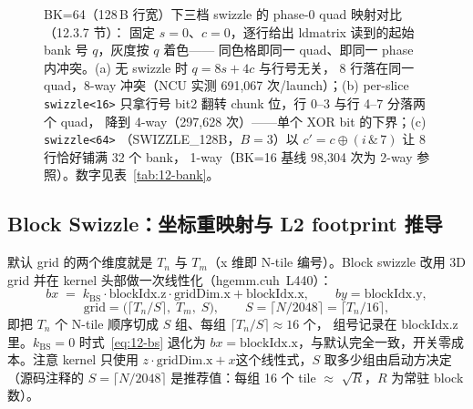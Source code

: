 \begin{figure}[H]
\caption{BK=64（128\,B 行宽）下三档 swizzle 的 phase-0 quad 映射对比（12.3.7 节）：
固定 $s{=}0$、$c{=}0$，逐行给出 ldmatrix 读到的起始 bank 号 $q$，灰度按 $q$ 着色——
同色格即同一 quad、即同一 phase 内冲突。(a) 无 swizzle 时 $q=8s+4c$ 与行号无关，
8 行落在同一 quad，8-way 冲突（NCU 实测 691{,}067 次/launch）；(b) per-slice
\texttt{swizzle<16>} 只拿行号 bit2 翻转 chunk 位，行 0--3 与行 4--7 分落两个 quad，
降到 4-way（297{,}628 次）——单个 XOR bit 的下界；(c) \texttt{swizzle<64>}
（SWIZZLE\_128B，$B{=}3$）以 $c'=c\oplus(i\,\&\,7)$ 让 8 行恰好铺满 32 个 bank，
1-way（BK=16 基线 98{,}304 次为 2-way 参照）。数字见表~\ref{tab:12-bank}。}
\label{fig:12-quad-swizzle}
\end{figure}

\subsection{Block Swizzle：坐标重映射与 L2 footprint 推导}

默认 grid 的两个维度就是 $T_n$ 与 $T_m$（x 维即 N-tile 编号）。Block swizzle 改用
3D grid 并在 kernel 头部做一次线性化（hgemm.cuh~L440）：
\begin{equation}
  bx \;=\; k_{\mathrm{BS}}\cdot \mathrm{blockIdx.z}\cdot \mathrm{gridDim.x}
         + \mathrm{blockIdx.x}, \qquad by=\mathrm{blockIdx.y},
  \label{eq:12-bs}
\end{equation}
\begin{equation}
  \mathrm{grid} = \bigl(\lceil T_n/S\rceil,\; T_m,\; S\bigr),\qquad
  S=\lceil N/2048\rceil=\lceil T_n/16\rceil ,
\end{equation}
即把 $T_n$ 个 N-tile 顺序切成 $S$ 组、每组 $\lceil T_n/S\rceil\approx16$ 个，
组号记录在 blockIdx.z 里。$k_{\mathrm{BS}}{=}0$ 时式~\ref{eq:12-bs} 退化为
$bx=\mathrm{blockIdx.x}$，与默认完全一致，开关零成本。注意 kernel 只使用
\textbf{$z\cdot\mathrm{gridDim.x}+x$}这个线性式，$S$ 取多少组由启动方决定
（源码注释的 $S{=}\lceil N/2048\rceil$ 是推荐值：每组 16 个 tile $\approx$
$\sqrt{R}$，$R$ 为常驻 block 数）。

